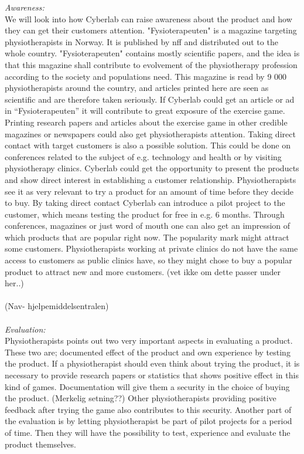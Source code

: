 \emph{Awareness:} \\ 
We will look into how Cyberlab can raise awareness about the product and how they can get their customers attention.  "Fysioterapeuten" is a magazine targeting physiotherapists in Norway. It is published by \ac{nff} and distributed out to the whole country. "Fysioterapeuten" contains mostly scientific papers, and the idea is that this magazine shall contribute to evolvement of the physiotherapy profession according to the society and populations need. This magazine is read by 9 000 physiotherapists around the country, and articles printed here are seen as scientific and are therefore taken seriously. If Cyberlab could get an article or ad in “Fysioterapeuten” it will contribute to great exposure of the exercise game.  Printing research papers and articles about the exercise game in other credible magazines or newspapers could also get physiotherapists attention.  Taking direct contact with target customers is also a possible solution. This could be done on conferences related to the subject of e.g. technology and health or by visiting physiotherapy clinics. Cyberlab could get the opportunity to present the products and show direct interest in establishing a customer relationship. Physiotherapists see it as very relevant to try a product for an amount of time before they decide to buy. By taking direct contact Cyberlab can introduce a pilot project to the customer, which means testing the product for free in e.g. 6 months. Through conferences, magazines or just word of mouth one can also get an impression of which products that are popular right now. The popularity mark might attract some customers. Physiotherapists working at private clinics do not have the same access to customers as public clinics have, so they might chose to buy a popular product to attract new and more customers. (vet ikke om dette passer under her..)\\ \\ 
(Nav- hjelpemiddelsentralen)\\ \\
\emph{Evaluation:}\\
Physiotherapists points out two very important aspects in evaluating a product. These two are; documented effect of the product and own experience by testing the product. If a physiotherapist should even think about trying the product, it is necessary to provide research papers or statistics that shows positive effect in this kind of games. Documentation will give them a security in the choice of buying the product. (Merkelig setning??) Other physiotherapists providing positive feedback after trying the game also contributes to this security. Another part of the evaluation is by letting physiotherapist be part of pilot projects for a period of time. Then they will have the possibility to test, experience and evaluate the product themselves.\\ \\
